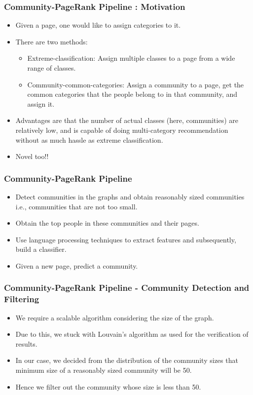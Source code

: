 \documentclass[9pt, compress]{beamer}
\begin{document}
\begin{frame}[fragile]
	\frametitle{Community-PageRank Pipeline : Motivation}
\vspace{-10mm}
\begin{itemize}
\item Given a page, one would like to assign categories to it.
\item There are two methods:
\begin{itemize}
	\item Extreme-classification: Assign multiple classes to a page from a wide range of classes.
    \item Community-common-categories: Assign a community to a page, get the common categories that the people belong to in that community, and assign it.
\end{itemize}
\item Advantages are that the number of actual classes (here, communities) are relatively low, and is capable of doing multi-category recommendation without as much hassle as extreme classification.
\item Novel too!!
\end{itemize}
\end{frame}

\begin{frame}[fragile]
	\frametitle{Community-PageRank Pipeline}
\vspace{-10mm}
\begin{itemize}
\item Detect communities in the graphs and obtain reasonably sized communities i.e., communities that are not too small.
\item Obtain the top people in these communities and their pages.
\item Use language processing techniques to extract features and subsequently, build a classifier.
\item Given a new page, predict a community.
\end{itemize}
\end{frame}

\begin{frame}[fragile]
	\frametitle{Community-PageRank Pipeline - Community Detection and Filtering}
\vspace{-10mm}
\begin{itemize}
\item We require a scalable algorithm considering the size of the graph.
\item Due to this, we stuck with Louvain's algorithm as used for the verification of results.
\item In our case, we decided from the distribution of the community sizes that minimum size of a reasonably sized community will be 50.
\item Hence we filter out the community whose size is less than 50.
\end{itemize}
\end{frame}
\end{document}

